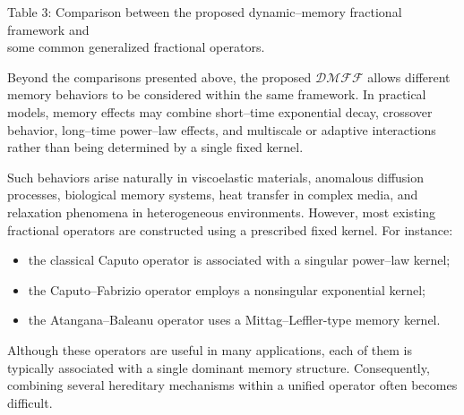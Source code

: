\documentclass[11pt]{article}
\numberwithin{equation}{section}
\begin{document}
\begin{table}[h!]
\vspace{1mm}

{\footnotesize
Table 3: Comparison between the proposed dynamic--memory fractional framework and \\some common generalized fractional operators.
}
\label{TabComparison}
\end{table}
Beyond the comparisons presented above, the proposed $\mathcal{DMFF}$ allows different memory behaviors to be considered within the same framework. In practical models, memory effects may combine short--time exponential decay, crossover behavior, long--time power--law effects, and multiscale or adaptive interactions rather than being determined by a single fixed kernel.

Such behaviors arise naturally in viscoelastic materials, anomalous diffusion processes, biological memory systems, heat transfer in complex media, and relaxation phenomena in heterogeneous environments.
However, most existing fractional operators are constructed using a prescribed fixed kernel. For instance:
\begin{itemize}[itemsep=2pt,topsep=2pt]

\item
the classical Caputo operator is associated with a singular power--law kernel;

\item
the Caputo--Fabrizio operator employs a nonsingular exponential kernel;

\item
the Atangana--Baleanu operator uses a Mittag--Leffler-type memory kernel.

\end{itemize}
Although these operators are useful in many applications, each of them is typically associated with a single dominant memory structure. Consequently, combining several hereditary mechanisms within a unified operator often becomes difficult.

\medskip
\end{document}
